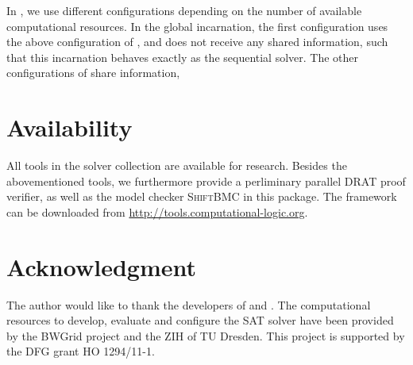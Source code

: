 \documentclass[conference]{IEEEtran}
\begin{document}
In \pcasso, we use different configurations depending on the number of available computational resources. 
In the global \priss incarnation, the first configuration uses the above configuration of \riss, and does not receive any shared information, such that this incarnation behaves exactly as the sequential solver. 
The other configurations of \priss share information,


\section{Availability}

All tools in the solver collection are available for research. 
Besides the abovementioned tools, we furthermore provide a perliminary parallel DRAT proof verifier, as well as the model checker \textsc{ShiftBMC} in this package.
The framework can be downloaded from \url{http://tools.computational-logic.org}.

\section*{Acknowledgment}
The author would like to thank the developers of \glucose and \minisat. 
The computational resources to develop, evaluate and configure the SAT solver have been provided by the BWGrid \cite{bwgrid} project and the ZIH of TU Dresden. 
This project is supported by the DFG grant HO 1294/11-1. 



% 


\end{document}
